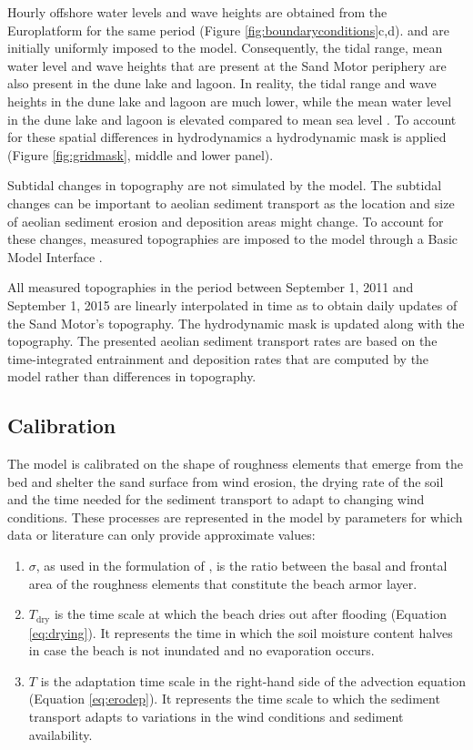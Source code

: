 Hourly offshore water levels and wave heights are obtained from the
Europlatform for the same period (Figure
\ref{fig:boundaryconditions}c,d).  and are initially uniformly imposed
to the model. Consequently, the tidal range, mean water level and wave
heights that are present at the Sand Motor periphery are also present
in the dune lake and lagoon. In reality, the tidal range and wave
heights in the dune lake and lagoon are much lower, while the mean
water level in the dune lake and lagoon is elevated compared to mean
sea level \citep{deVries2015}. To account for these spatial
differences in hydrodynamics a hydrodynamic mask is applied (Figure
\ref{fig:gridmask}, middle and lower panel).

Subtidal changes in topography are not simulated by the model. The
subtidal changes can be important to aeolian sediment transport as the
location and size of aeolian sediment erosion and deposition areas
might change. To account for these changes, measured topographies are
imposed to the model through a Basic Model Interface
\citep[BMI,][]{Peckham2013}.

All measured topographies in the period between September 1, 2011 and
September 1, 2015 are linearly interpolated in time as to obtain daily
updates of the Sand Motor's topography. The hydrodynamic mask is
updated along with the topography. The presented aeolian sediment
transport rates are based on the time-integrated entrainment and
deposition rates that are computed by the model rather than
differences in topography.

\subsection{Calibration}

The model is calibrated on the shape of roughness elements that emerge
from the bed and shelter the sand surface from wind erosion, the
drying rate of the soil and the time needed for the sediment transport
to adapt to changing wind conditions. These processes are represented
in the model by parameters for which data or literature can only
provide approximate values:

\begin{enumerate}
\item $\sigma$, as used in the formulation of \citet[][Equation
  \ref{eq:raupach}]{Raupach1993}, is the ratio between the basal and
  frontal area of the roughness elements that constitute the beach
  armor layer.
\item $T_{\mathrm{dry}}$ is the time scale at which the beach dries
  out after flooding (Equation \ref{eq:drying}). It represents the
  time in which the soil moisture content halves in case the beach is
  not inundated and no evaporation occurs.
\item $T$ is the adaptation time scale in the right-hand side of the
  advection equation (Equation \ref{eq:erodep}). It represents the
  time scale to which the sediment transport adapts to variations in
  the wind conditions and sediment availability.
\end{enumerate}

